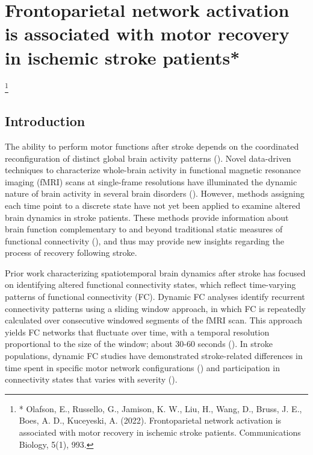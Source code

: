 \documentclass[phd,tocprelim]{cornell}
\newcommand\blfootnote[1]{%
  \begingroup
  \renewcommand\thefootnote{}\footnote{#1}%
  \addtocounter{footnote}{-1}%
  \endgroup
}
\begin{document}
\label{chap:1}

\chapter{Frontoparietal network activation is associated with motor recovery in ischemic stroke patients*}
\blfootnote{* Olafson, E., Russello, G., Jamison, K. W., Liu, H., Wang, D., Bruss, J. E., Boes, A. D.,  Kuceyeski, A. (2022). Frontoparietal network activation is associated with motor recovery in ischemic stroke patients. Communications Biology, 5(1), 993.}
\section{Introduction}
	The ability to perform motor functions after stroke depends on the coordinated reconfiguration of distinct global brain activity patterns (\cite{Ward2003-zd,Park2011-kx}). Novel data-driven techniques to characterize whole-brain activity in functional magnetic resonance imaging (fMRI) scans at single-frame resolutions have illuminated the dynamic nature of brain activity in several brain disorders (\cite{ Braun2021-iy, Adhikari2020-tk, Kaiser2019-rf}). However, methods assigning each time point to a discrete state have not yet been applied to examine altered brain dynamics in stroke patients. These methods provide information about brain function complementary to and beyond traditional static measures of functional connectivity (\cite{Cornblath2020-nc}), and thus may provide new insights regarding the process of recovery following stroke.
	
	Prior work characterizing spatiotemporal brain dynamics after stroke has focused on identifying altered functional connectivity states, which reflect time-varying patterns of functional connectivity (FC). Dynamic FC analyses identify recurrent connectivity patterns using a sliding window approach, in which FC is repeatedly calculated over consecutive windowed segments of the fMRI scan. This approach yields FC networks that fluctuate over time, with a temporal resolution proportional to the size of the window; about 30-60 seconds (\cite{Savva2019-hk}). In stroke populations, dynamic FC studies have demonstrated stroke-related differences in time spent in specific motor network configurations (\cite{Bonkhoff2020-bx}) and participation in connectivity states that varies with severity (\cite{Bonkhoff2020-de}). 
	
\end{document}
